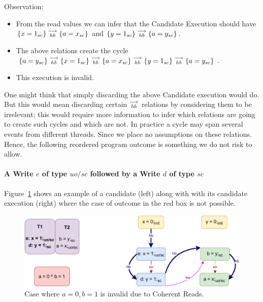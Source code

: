         Observation:
        \begin{itemize}
            \item From the read values we can infer that the Candidate Execution should have $\{x=1_{sc}\}\stackrel{\longrightarrow}{_{hb}}\{a=x_{sc}\}$ and $\{y=1_{sc}\}\stackrel{\longrightarrow}{_{hb}}\{a=y_{sc}\}$.
            \item The above relations create the cycle $\{a=y_{sc}\}\stackrel{\longrightarrow}{_{hb}}\{x=1_{sc}\}\stackrel{\longrightarrow}{_{hb}}\{a=x_{sc}\}\stackrel{\longrightarrow}{_{hb}}\{y=1_{sc}\}\stackrel{\longrightarrow}{_{hb}}\{a=y_{sc}\}$.
            \item This execution is invalid. 
        \end{itemize}

        One might think that simply discarding the above Candidate execution would do. 
        But this would mean discarding certain $\stackrel{\longrightarrow}{_{hb}}$ relations by considering them to be irrelevant; this would require more information to infer which relations are going to create such cycles and which are not. 
        In practice a cycle may span several events from different threads.
        Since we place no assumptions on these relations.
        Hence, the following reordered program outcome is something we do not risk to allow.


    \paragraph{A Write $e$ of type $uo/sc$ followed by a Write $d$ of type $sc$}
        
        Figure~\ref{reord_counter:example4(a)} shows an example of a candidate (left) along with with its candidate execution (right) where the case of outcome in the red box is not possible. 
        \begin{figure}[H]
            \centering
            \includegraphics[scale=0.7]{7.CounterExamples/ReorderingCandidate/Example7(Wuo,sc-Wsc).pdf}
            \caption{Case where $a = 0, b = 1$ is invalid due to Coherent Reads.}
            \label{reord_counter:example4(a)}
        \end{figure}
        
